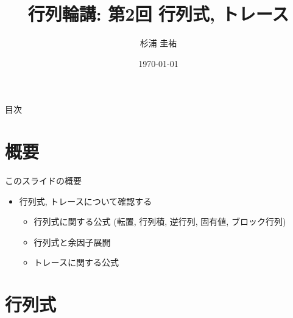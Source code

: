 \documentclass[dvipdfmx,notheorems,t]{beamer}
\title{行列輪講: 第2回 行列式, トレース}
\author{杉浦 圭祐}
\institute[松谷研究室]{慶應義塾大学理工学部情報工学科 松谷研究室}
\date{\today}
\begin{document}
\linespread{1.1}

\frame{\titlepage}

\section{}

\begin{frame}{目次}
\tableofcontents
\end{frame}

\section{概要}

\begin{frame}{このスライドの概要}
\begin{itemize}
  \item 行列式, トレースについて確認する
  \begin{itemize}
    \item 行列式に関する公式 (転置, 行列積, 逆行列, 固有値, ブロック行列)
    \item 行列式と余因子展開
    \item トレースに関する公式
  \end{itemize}
\end{itemize}
\end{frame}

\section{行列式}
\end{document}
